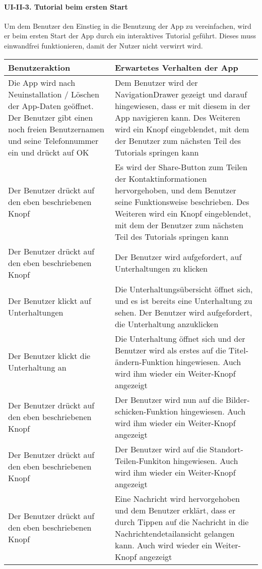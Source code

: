 \paragraph{UI-II-3. Tutorial beim ersten
Start}\label{tutorial-beim-ersten-start}

Um dem Benutzer den Einstieg in die Benutzung der App zu vereinfachen,
wird er beim ersten Start der App durch ein interaktives Tutorial
geführt. Dieses muss einwandfrei funktionieren, damit der Nutzer nicht
verwirrt wird.

\begin{longtable}{|p{8cm}|p{8.5cm}|}
\hline
Benutzeraktion & Erwartetes Verhalten der App\tabularnewline
\hline

Die App wird nach Neuinstallation / Löschen der App-Daten geöffnet. Der
Benutzer gibt einen noch freien Benutzernamen und seine Telefonnummer
ein und drückt auf OK & Dem Benutzer wird der NavigationDrawer gezeigt
und darauf hingewiesen, dass er mit diesem in der App navigieren kann.
Des Weiteren wird ein Knopf eingeblendet, mit dem der Benutzer zum
nächsten Teil des Tutorials springen kann\tabularnewline
Der Benutzer drückt auf den eben beschriebenen Knopf & Es wird der
Share-Button zum Teilen der Kontaktinformationen hervorgehoben, und dem
Benutzer seine Funktionsweise beschrieben. Des Weiteren wird ein Knopf
eingeblendet, mit dem der Benutzer zum nächsten Teil des Tutorials
springen kann\tabularnewline
Der Benutzer drückt auf den eben beschriebenen Knopf & Der Benutzer wird
aufgefordert, auf Unterhaltungen zu klicken\tabularnewline
Der Benutzer klickt auf Unterhaltungen & Die Unterhaltungsübersicht
öffnet sich, und es ist bereits eine Unterhaltung zu sehen. Der Benutzer
wird aufgefordert, die Unterhaltung anzuklicken\tabularnewline
Der Benutzer klickt die Unterhaltung an & Die Unterhaltung öffnet sich
und der Benutzer wird als erstes auf die Titel-ändern-Funktion
hingewiesen. Auch wird ihm wieder ein Weiter-Knopf
angezeigt\tabularnewline
Der Benutzer drückt auf den eben beschriebenen Knopf & Der Benutzer wird
nun auf die Bilder-schicken-Funktion hingewiesen. Auch wird ihm wieder
ein Weiter-Knopf angezeigt\tabularnewline
Der Benutzer drückt auf den eben beschriebenen Knopf & Der Benutzer wird
auf die Standort-Teilen-Funkiton hingewiesen. Auch wird ihm wieder ein
Weiter-Knopf angezeigt\tabularnewline
Der Benutzer drückt auf den eben beschriebenen Knopf & Eine Nachricht
wird hervorgehoben und dem Benutzer erklärt, dass er durch Tippen auf
die Nachricht in die Nachrichtendetailansicht gelangen kann. Auch wird
wieder ein Weiter-Knopf angezeigt\tabularnewline

\end{longtable}
